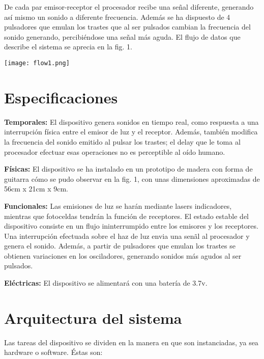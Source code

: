 \documentclass[12pt,journal]{IEEEtran}
\begin{document}
De cada par emisor-receptor el procesador recibe una se\~nal diferente, generando as\'i mismo un sonido a diferente frecuencia. Adem\'as se ha dispuesto de 4 pulsadores que emulan los trastes que al ser pulsados cambian la frecuencia del sonido generando, percibi\'endose una se\~nal m\'as aguda.
El flujo de datos que describe el sistema se aprecia en la fig. 1.
\begin{center}
	\texttt{[image: flow1.png]}
\end{center}

\section{Especificaciones}  

\textbf{Temporales: }El dispositivo genera sonidos en tiempo real, como respuesta a una interrupci\'on f\'isica entre el emisor de luz y el receptor. Adem\'as, tambi\'en modifica la frecuencia del sonido emitido al pulsar los trastes; el delay que le toma al procesador efectuar esas operaciones no es perceptible al o\'ido humano.

\textbf{F\'isicas: }El dispositivo se ha instalado en un prototipo de madera con forma de guitarra c\'omo se pudo observar en la fig. 1, con unas dimensiones aproximadas de 56cm x 21cm x 9cm.

\textbf{Funcionales: }Las emisiones de luz se har\'an mediante lasers indicadores, mientras que fotoceldas tendr\'an la funci\'on de receptores. El estado estable del dispositivo consiste en un flujo ininterrumpido entre los emisores y los receptores. Una interrupci\'on efectuada sobre el haz de luz envia una sen\~al al procesador y genera el sonido. Adem\'as, a partir de pulsadores que emulan los trastes se obtienen variaciones en los osciladores, generando sonidos m\'as agudos al ser pulsados.

\textbf{El\'ectricas: }El dispositivo se alimentar\'a con una bater\'ia de 3.7v.

\section{Arquitectura del sistema}
Las tareas del dispositivo se dividen en la manera en que son instanciadas, ya sea hardware o software. \'Estas son:
\end{document}
